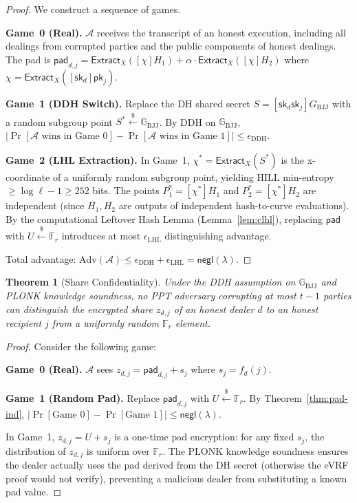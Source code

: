 \documentclass[11pt,a4paper]{article}
\newtheorem{theorem}{Theorem}[section]
\newcommand{\F}{\mathbb{F}}
\newcommand{\G}{\mathbb{G}}
\newcommand{\Gbj}{\G_{\mathrm{BJJ}}}
\newcommand{\Fr}{\F_r}
\newcommand{\genbjj}{G_{\mathrm{BJJ}}}
\newcommand{\sk}{\mathsf{sk}}
\newcommand{\pk}{\mathsf{pk}}
\newcommand{\pad}{\mathsf{pad}}
\newcommand{\Extract}{\mathsf{Extract}_X}
\newcommand{\dhx}{\chi}
\newcommand{\negl}{\mathsf{negl}}
\newcommand{\getsr}{\xleftarrow{\$}}
\begin{document}
\begin{proof}
  We construct a sequence of games.

  \smallskip\noindent\textbf{Game~0 (Real).}
  $\mathcal{A}$ receives the transcript of an honest execution, including
  all dealings from corrupted parties and the public components of honest
  dealings. The pad is $\pad_{d,j} = \Extract([\dhx]H_1) + \alpha \cdot
  \Extract([\dhx]H_2)$ where $\dhx = \Extract([\sk_d]\pk_j)$.

  \smallskip\noindent\textbf{Game~1 (DDH Switch).}
  Replace the DH shared secret $S = [\sk_d \sk_j]\genbjj$ with a random
  subgroup point $S^* \getsr \Gbj$. By DDH on $\Gbj$, $|\Pr[\mathcal{A}
  \text{ wins in Game~0}] - \Pr[\mathcal{A} \text{ wins in Game~1}]| \le
  \epsilon_{\mathrm{DDH}}$.

  \smallskip\noindent\textbf{Game~2 (LHL Extraction).}
  In Game~1, $\dhx^* = \Extract(S^*)$ is the x-coordinate of a uniformly random
  subgroup point, yielding HILL min-entropy $\ge \log\ell - 1 \ge 252$ bits.
  The points $P_1^* = [\dhx^*]H_1$ and $P_2^* = [\dhx^*]H_2$ are independent
  (since $H_1, H_2$ are outputs of independent hash-to-curve evaluations).
  By the computational Leftover Hash Lemma (Lemma~\ref{lem:clhl}), replacing
  $\pad$ with $U \getsr \Fr$ introduces at most $\epsilon_{\mathrm{LHL}}$
  distinguishing advantage.

  \smallskip\noindent
  Total advantage: $\mathrm{Adv}(\mathcal{A}) \le \epsilon_{\mathrm{DDH}}
  + \epsilon_{\mathrm{LHL}} = \negl(\lambda)$.
\end{proof}

\begin{theorem}[Share Confidentiality]
  \label{thm:share-conf}
  Under the DDH assumption on $\Gbj$ and PLONK knowledge soundness, no PPT
  adversary corrupting at most $t - 1$ parties can distinguish the encrypted
  share $z_{d,j}$ of an honest dealer $d$ to an honest recipient $j$ from a
  uniformly random $\Fr$ element.
\end{theorem}

\begin{proof}
  Consider the following game:

  \smallskip\noindent\textbf{Game~0 (Real).}
  $\mathcal{A}$ sees $z_{d,j} = \pad_{d,j} + s_j$ where $s_j = f_d(j)$.

  \smallskip\noindent\textbf{Game~1 (Random Pad).}
  Replace $\pad_{d,j}$ with $U \getsr \Fr$. By Theorem~\ref{thm:pad-ind},
  $|\Pr[\text{Game~0}] - \Pr[\text{Game~1}]| \le \negl(\lambda)$.

  \smallskip\noindent
  In Game~1, $z_{d,j} = U + s_j$ is a one-time pad encryption: for any
  fixed $s_j$, the distribution of $z_{d,j}$ is uniform over $\Fr$. The
  PLONK knowledge soundness ensures the dealer actually uses the pad
  derived from the DH secret (otherwise the eVRF proof would not verify),
  preventing a malicious dealer from substituting a known pad value.
\end{proof}
\end{document}
